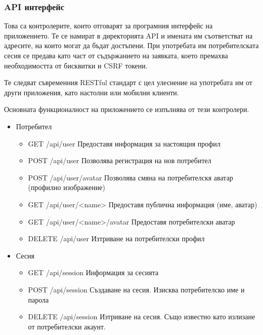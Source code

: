 \subsubsection{API интерфейс}
Това са контролерите, които отговарят за програмния
интерфейс на приложението. Те се намират в директорията
API и имената им съответстват на адресите, на които могат
да бъдат достъпени. При употребата им потребителската
сесия се предава като част от съдържанието на заявката,
което премахва необходимостта от бисквитки и CSRF токени.

Те следват съвременния RESTful стандарт с цел улеснение
на употребата им от други приложения, като настолни или
мобилни клиенти.

Основната функционалност на приложението се изпълнява
от тези контролери.

\begin{itemize}

    \item{Потребител}
    \begin{itemize}
        \item GET /api/user
            Предоставя информация за настоящия профил
        \item POST /api/user
            Позволява регистрация на нов потребител
        \item POST /api/user/avatar
            Позволява смяна на потребителскя аватар
            (профилно изображение)
        \item GET /api/user/<name>
            Предоставя публична информация (име, аватар)
        \item GET /api/user/<name>/avatar
            Предоставя потребителски аватар
        \item DELETE /api/user
            Изтриване на потребителски профил
    \end{itemize}

    \item{Сесия}
    \begin{itemize}
        \item GET /api/session
            Информация за сесията
        \item POST /api/session
            Създаване на сесия.
            Изисква потребителско име и парола
        \item DELETE /api/session
            Изтриване на сесия. Също известно като
            излизане от потребителски акаунт.
    \end{itemize}


\end{itemize}
